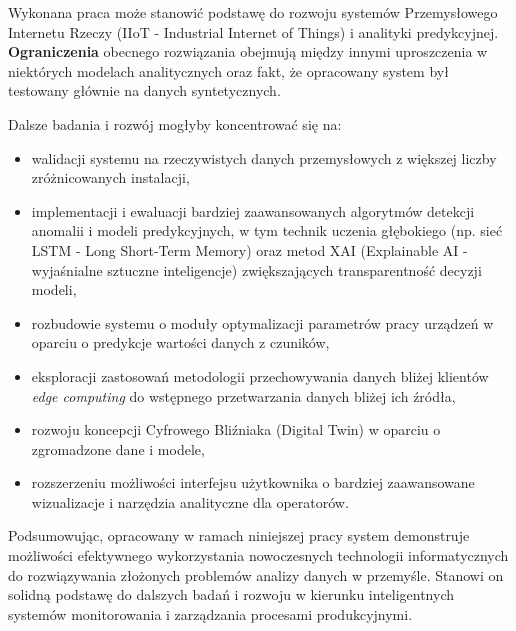 \vspace{0.3em}

Wykonana praca może stanowić podstawę do rozwoju systemów Przemysłowego Internetu Rzeczy (IIoT - Industrial Internet of Things) i analityki predykcyjnej. \textbf{Ograniczenia} obecnego rozwiązania obejmują między innymi uproszczenia w niektórych modelach analitycznych oraz fakt, że opracowany system był testowany głównie na danych syntetycznych. 

\vspace{0.3em}

Dalsze badania i rozwój mogłyby koncentrować się na:
\begin{itemize}
    \item walidacji systemu na rzeczywistych danych przemysłowych z większej liczby zróżnicowanych instalacji,
    \item implementacji i ewaluacji bardziej zaawansowanych algorytmów detekcji anomalii i modeli predykcyjnych, w tym technik uczenia głębokiego (np. sieć LSTM - Long Short-Term Memory) oraz metod XAI (Explainable AI - wyjaśnialne sztuczne inteligencje) zwiększających transparentność decyzji modeli,
    \item rozbudowie systemu o moduły optymalizacji parametrów pracy urządzeń w oparciu o predykcje wartości danych z czuników,
    \item eksploracji zastosowań metodologii przechowywania danych bliżej klientów \textit{edge computing} do wstępnego przetwarzania danych bliżej ich źródła,
    \item rozwoju koncepcji Cyfrowego Bliźniaka (Digital Twin) w oparciu o zgromadzone dane i modele,
    \item rozszerzeniu możliwości interfejsu użytkownika o bardziej zaawansowane wizualizacje i narzędzia analityczne dla operatorów.
\end{itemize}

\vspace{0.3em}

Podsumowując, opracowany w ramach niniejszej pracy system demonstruje możliwości efektywnego wykorzystania nowoczesnych technologii informatycznych do rozwiązywania złożonych problemów analizy danych w przemyśle. Stanowi on solidną podstawę do dalszych badań i rozwoju w kierunku inteligentnych systemów monitorowania i zarządzania procesami produkcyjnymi. 